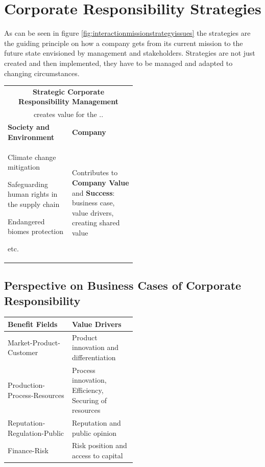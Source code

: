 \documentclass[11pt]{article}
\theoremstyle{definition}
\begin{document}
\section{Corporate Responsibility Strategies}
As can be seen in figure \ref{fig:interactionmissionstrategyissues} the strategies are the guiding principle on how a company gets from its current mission to the future state envisioned by management and stakeholders. Strategies are not just created and then implemented, they have to be managed and adapted to changing circumstances.

\begin{tabularx}{\linewidth}{p{0.5\linewidth} X}
	\multicolumn{2}{c}{\textbf{Strategic Corporate Responsibility Management}}\\
	\multicolumn{2}{c}{creates value for the ..}\\[0.5em]
	\textbf{Society and Environment} & \textbf{Company}\\[0.5em]
	\begin{itemize}
		[
		left=0pt,
		nosep,
		before={\begin{minipage}[t]{\hsize}},
			after={\end{minipage}}
		]
		\item Climate change mitigation
		\item Safeguarding human rights in the supply chain
		\item Endangered biomes protection
		\item etc.
	\end{itemize} & Contributes to \textbf{Company Value} and \textbf{Success}: business case, value drivers, creating shared value
\end{tabularx}

\subsection{Perspective on Business Cases of Corporate Responsibility}
\begin{tabularx}{\linewidth}{p{0.5\linewidth} X}
	\textbf{Benefit Fields} & \textbf{Value Drivers}\\
	\hline
	Market-Product-Customer & Product innovation and differentiation\\
	Production-Process-Resources & Process innovation, Efficiency, Securing of resources\\
	Reputation-Regulation-Public & Reputation and public opinion\\
	Finance-Risk & Risk position and access to capital
\end{tabularx}
\end{document}
